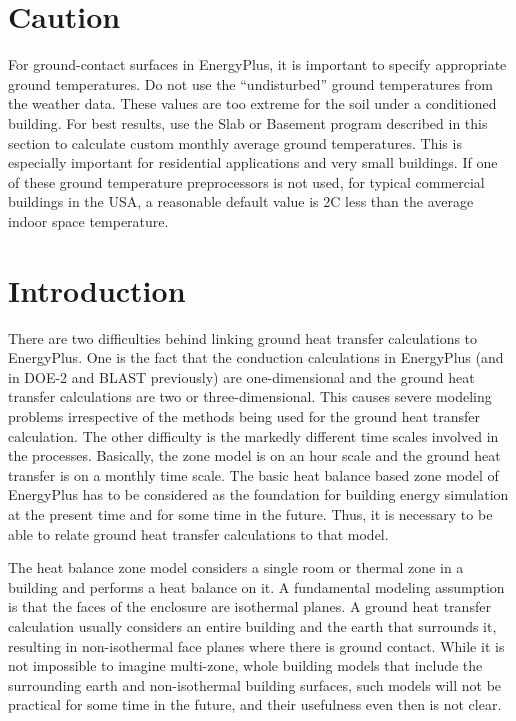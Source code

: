 \section{Caution}\label{caution}

For ground-contact surfaces in EnergyPlus, it is important to specify appropriate ground temperatures. Do not use the ``undisturbed'' ground temperatures from the weather data. These values are too extreme for the soil under a conditioned building. For best results, use the Slab or Basement program described in this section to calculate custom monthly average ground temperatures. This is especially important for residential applications and very small buildings. If one of these ground temperature preprocessors is not used, for typical commercial buildings in the USA, a reasonable default value is 2C less than the average indoor space temperature.

\section{Introduction}\label{introduction-003}

There are two difficulties behind linking ground heat transfer calculations to EnergyPlus. One is the fact that the conduction calculations in EnergyPlus (and in DOE-2 and BLAST previously) are one-dimensional and the ground heat transfer calculations are two or three-dimensional. This causes severe modeling problems irrespective of the methods being used for the ground heat transfer calculation. The other difficulty is the markedly different time scales involved in the processes. Basically, the zone model is on an hour scale and the ground heat transfer is on a monthly time scale. The basic heat balance based zone model of EnergyPlus has to be considered as the foundation for building energy simulation at the present time and for some time in the future. Thus, it is necessary to be able to relate ground heat transfer calculations to that model.

The heat balance zone model considers a single room or thermal zone in a building and performs a heat balance on it. A fundamental modeling assumption is that the faces of the enclosure are isothermal planes. A ground heat transfer calculation usually considers an entire building and the earth that surrounds it, resulting in non-isothermal face planes where there is ground contact. While it is not impossible to imagine multi-zone, whole building models that include the surrounding earth and non-isothermal building surfaces, such models will not be practical for some time in the future, and their usefulness even then is not clear.

